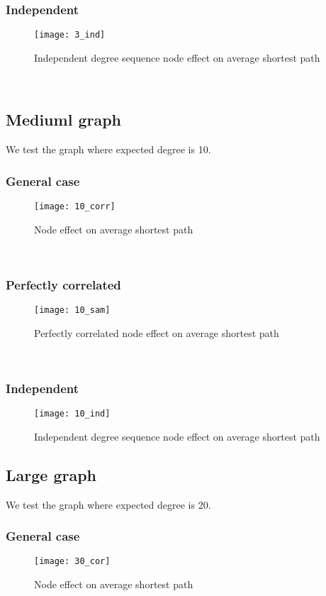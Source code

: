 \documentclass[10pt,english]{article}\usepackage{graphicx, color}
\numberwithin{equation}{section}
\numberwithin{figure}{section}
\begin{document}
\subsubsection{Independent}
\begin{figure}[htbp]
\centering\texttt{[image: 3\_ind]}
\caption{Independent degree sequence node effect on average shortest path}
\end{figure}
\quad\\


\subsection{Mediuml graph}
We test the graph where expected degree is 10. 
\subsubsection{General case}
\begin{figure}[htbp]
\centering\texttt{[image: 10\_corr]}
\caption{Node effect on average shortest path}
\end{figure}
\quad\\


\subsubsection{Perfectly correlated}

\begin{figure}[htbp]
\centering\texttt{[image: 10\_sam]}
\caption{Perfectly correlated node effect on average shortest path}
\end{figure}
\quad\\


\subsubsection{Independent}
\begin{figure}[htbp]
\centering\texttt{[image: 10\_ind]}
\caption{Independent degree sequence node effect on average shortest path}
\end{figure}
\subsection{Large graph}
We test the graph where expected degree is 20. 
\subsubsection{General case}
\begin{figure}[htbp]
\centering\texttt{[image: 30\_cor]}
\caption{Node effect on average shortest path}
\end{figure}
\quad\\
\end{document}
